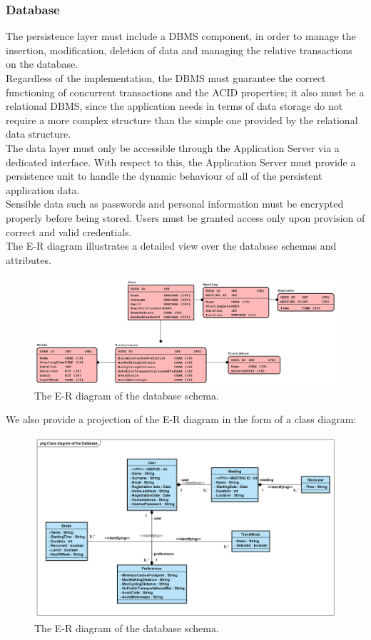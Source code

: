 \subsubsection{Database}
The persistence layer must include a DBMS component, in order to manage the insertion, modiﬁcation, deletion of data and managing the relative transactions on the database.\\
Regardless of the implementation, the DBMS must guarantee the correct functioning of concurrent transactions and the ACID properties; it also must be a relational DBMS, since the application needs in terms of data storage do not require a more complex structure than the simple one provided by the relational data structure.\\
The data layer must only be accessible through the Application Server via a dedicated interface. With respect to this, the Application Server must provide a persistence unit to handle the dynamic behaviour of all of the persistent application data.\\
Sensible data such as passwords and personal information must be encrypted properly before being stored. Users must be granted access only upon provision of correct and valid credentials.\\
The E-R diagram illustrates a detailed view over the database schemas and attributes.

\begin{figure}[H]
\begin{center}
		\includegraphics[width=1.3\textwidth]{images/ertravlendar}
		\caption{The E-R diagram of the database schema.}
		\label{erdiagram}
\end{center}
\end{figure}

\clearpage
We also provide a projection of the E-R diagram in the form of a class diagram:

\begin{figure}[H]
\begin{center}
		\includegraphics[width=1.3\textwidth]{images/databasedesignclass}
		\caption{The E-R diagram of the database schema.}
		\label{erdiagram}
\end{center}
\end{figure}


